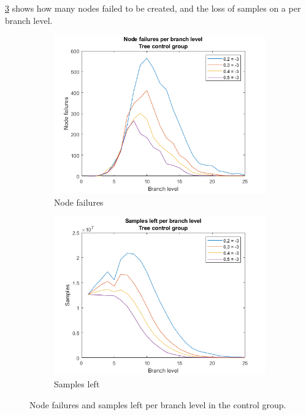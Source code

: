 \cref{fig:tree:treecontrolnodesample} shows how many nodes failed to be created, and the loss of samples on a per branch level.

\begin{figure}
    \centering
    \begin{subfigure}[b]{.49\textwidth}
        \centering
        \includegraphics[width=\textwidth]{figures/treecontrolnodefail.png}
        \caption{Node failures}
        \label{sfig:tree:treecontrolnode}
    \end{subfigure}
    \hfill
    \begin{subfigure}[b]{.49\textwidth}
        \centering
        \includegraphics[width=\textwidth]{figures/treecontrolsampleloss.png}
        \caption{Samples left}
        \label{sfig:tree:treecontrolsample}
    \end{subfigure}
    \caption{Node failures and samples left per branch level in the control group.}
    \label{fig:tree:treecontrolnodesample}
\end{figure}

